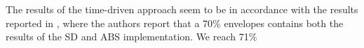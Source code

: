 %
%

The results of the time-driven approach seem to be in accordance with the results reported in \cite{macal_agent-based_2010}, where the authors report that a 70\% envelopes contains both the results of the SD and ABS implementation. We reach 71\% 

